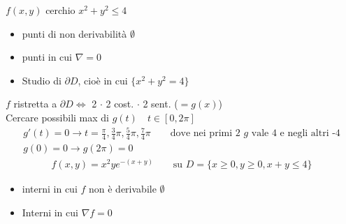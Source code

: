 \documentclass[a4paper, oneside]{article}
\begin{document}
        \begin{example}
            $f(x,y)$ cerchio $x^2+y^2 \leq 4$\\
            \begin{itemize}
                \item punti di non derivabilità $\emptyset$
                \item punti in cui $\nabla = 0$
                \item Studio di $\partial D$, cioè in cui $\{x^2+y^2=4\}$
            \end{itemize}

            $f$ ristretta a $\partial D \Leftrightarrow$ 2 $\cdot$ 2 cost. $\cdot$ 2 sent. ($= g(x)$)\\
            Cercare possibili max di $g(t) \quad t \in [0,2\pi]$\\
            \begin{gather*}
                g'(t) = 0 \to t = \frac{\pi}{4}, \frac{3}{4}\pi, \frac{5}{4}\pi, \frac{7}{4}\pi \qquad \text{dove nei primi 2 $g$ vale 4 e negli altri -4}\\
                g(0) = 0 \to g(2\pi) = 0
           \end{gather*}
           \begin{gather*}
            f(x,y) = x^2ye^{-(x+y)} \qquad \text{su } D=\{x \geq 0, y \geq 0, x+y \leq 4\}
           \end{gather*}
           \begin{itemize}
            \item interni in cui $f$ non è derivabile $\emptyset$
            \item Interni in cui $\nabla f = 0$
           \end{itemize}
           \begin{center}

\end{center}
\end{example}
\end{document}
